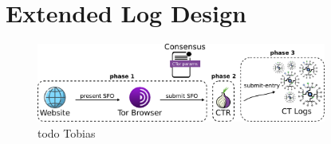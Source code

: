 \section{Extended Log Design} \label{sec:design-log}

%
%

%
%

%
%

%
%

%
%

%
%

\begin{figure}
    \centering
    \includegraphics[width=0.85\textwidth]{img/design-log}
    \caption{todo Tobias}
    \label{fig:design-log}
\end{figure}
